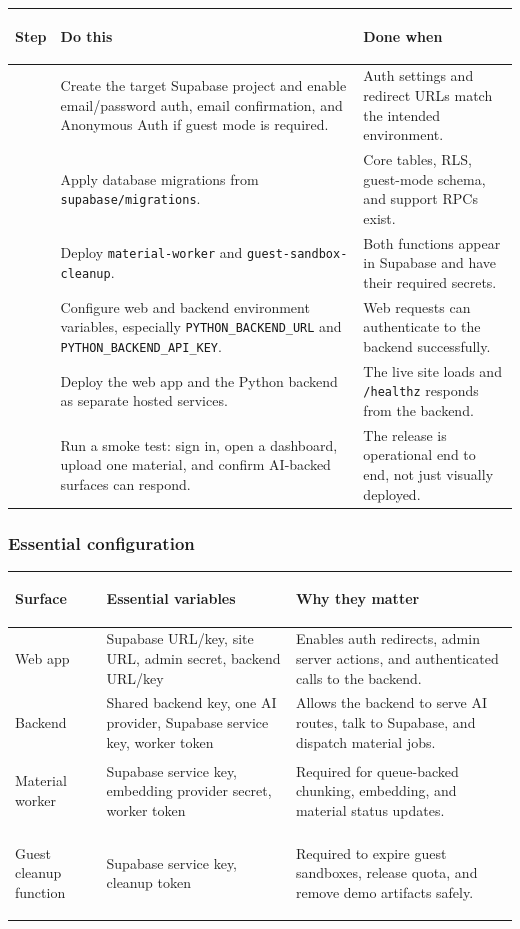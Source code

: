 \documentclass[11pt,a4paper]{article}
\begin{document}
\begin{table}[H]
\centering
\footnotesize
\begin{tabularx}{\textwidth}{>{\bfseries\raggedright\arraybackslash}p{1.1cm}>{\raggedright\arraybackslash}p{5.9cm}X}
\toprule
Step & Do this & Done when \\
\midrule
1 & Create the target Supabase project and enable email/password auth, email confirmation, and Anonymous Auth if guest mode is required. & Auth settings and redirect URLs match the intended environment. \\
2 & Apply database migrations from \texttt{supabase/migrations}. & Core tables, RLS, guest-mode schema, and support RPCs exist. \\
3 & Deploy \texttt{material-worker} and \texttt{guest-sandbox-cleanup}. & Both functions appear in Supabase and have their required secrets. \\
4 & Configure web and backend environment variables, especially \texttt{PYTHON\_BACKEND\_URL} and \texttt{PYTHON\_BACKEND\_API\_KEY}. & Web requests can authenticate to the backend successfully. \\
5 & Deploy the web app and the Python backend as separate hosted services. & The live site loads and \texttt{/healthz} responds from the backend. \\
6 & Run a smoke test: sign in, open a dashboard, upload one material, and confirm AI-backed surfaces can respond. & The release is operational end to end, not just visually deployed. \\
\bottomrule
\end{tabularx}
\end{table}

\subsubsection*{Essential configuration}

\begin{table}[H]
\centering
\footnotesize
\begin{tabularx}{\textwidth}{>{\bfseries\raggedright\arraybackslash}p{2.3cm}>{\raggedright\arraybackslash}p{5.5cm}X}
\toprule
Surface & Essential variables & Why they matter \\
\midrule
Web app & Supabase URL/key, site URL, admin secret, backend URL/key & Enables auth redirects, admin server actions, and authenticated calls to the backend. \\
Backend & Shared backend key, one AI provider, Supabase service key, worker token & Allows the backend to serve AI routes, talk to Supabase, and dispatch material jobs. \\
Material worker & Supabase service key, embedding provider secret, worker token & Required for queue-backed chunking, embedding, and material status updates. \\
Guest cleanup function & Supabase service key, cleanup token & Required to expire guest sandboxes, release quota, and remove demo artifacts safely. \\
\bottomrule
\end{tabularx}
\end{table}
\end{document}
